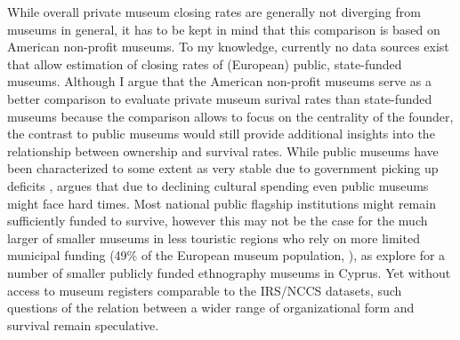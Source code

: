 \documentclass[12pt]{article}
\begin{document}
While overall private museum closing rates are generally not diverging from museums in general, it has to be kept in mind that this comparison is based on American non-profit museums.
To my knowledge, currently no data sources exist that allow estimation of closing rates of (European) public, state-funded museums.
Although I argue that the American non-profit museums serve as a better comparison to evaluate private museum surival rates than state-funded museums because the comparison allows to focus on the centrality of the founder, the contrast to public museums would still provide additional insights into the relationship between ownership and survival rates.
While public museums have been characterized to some extent as very stable due to government picking up deficits \parencite{Meier_Frey_2003_faces,Bechtler_Imhof_2018_future}, \textcite{Walker_2019_collector} argues that due to declining cultural spending even public museums might face hard times.
Most national public flagship institutions might remain sufficiently funded to survive, however this may not be the case for the much larger of smaller museums in less touristic regions who rely on more limited municipal funding (49\% of the European museum population, \cite{EGMUS_2024_complete}), as \textcite{StylianouLambert_etal_2014_museums} explore for a number of smaller publicly funded ethnography museums in Cyprus.
Yet without access to museum registers comparable to the IRS/NCCS datasets, such questions of the relation between a wider range of organizational form and survival remain speculative.
\end{document}
